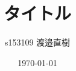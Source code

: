 \documentclass[10.5pt, a4paper]{jsarticle}
\title{タイトル}
\author{s153109 渡邉直樹}
\date{\today}
\begin{document}
\maketitle

\section{}

\subsection{}
\end{document}
